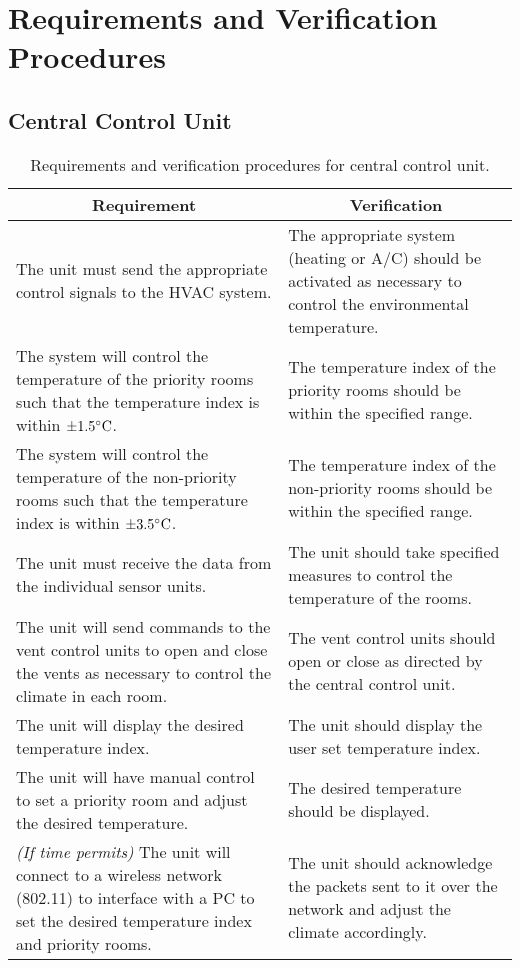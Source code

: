 \pagebreak
\section{Requirements and Verification Procedures}
%
%
\subsection{Central Control Unit}
\begin{table}[htbp]
\begin{tabular}{|p{}|p{}|}
\hline
\multicolumn{1}{|c|}{Requirement} & \multicolumn{1}{|c|}{Verification} \\
\hline\hline
The unit must send the appropriate control signals to the HVAC system. & The appropriate system (heating or A/C) should be activated as necessary to control the environmental temperature.\\
\hline
The system will control the temperature of the priority rooms such that the temperature index is within $\pm 1.5^{\circ}{\rm C}$. & The temperature index of the priority rooms should be within the specified range.\\
\hline
The system will control the temperature of the non-priority rooms such that the temperature index is within $\pm 3.5^{\circ}{\rm C}$. & The temperature index of the non-priority rooms should be within the specified range.\\
\hline
The unit must receive the data from the individual sensor units. & The unit should take specified measures to control the temperature of the rooms.\\
\hline
The unit will send commands to the vent control units to open and close the vents as necessary to control the climate in each room. & The vent control units should open or close as directed by the central control unit.\\
\hline
The unit will display the desired temperature index. & The unit should display the user set temperature index. \\
\hline
The unit will have manual control to set a priority room and adjust the desired temperature. & The desired temperature should be displayed.\\
\hline
{\it (If time permits)}
The unit will connect to a wireless network (802.11) to interface with a PC to set the desired temperature index and priority rooms. & The unit should acknowledge the packets sent to it over the network and adjust the climate accordingly. \\
\hline
\end{tabular}
\caption{Requirements and verification procedures for central control unit.}
\label{tab:mainreq}
\end{table}
\pagebreak

